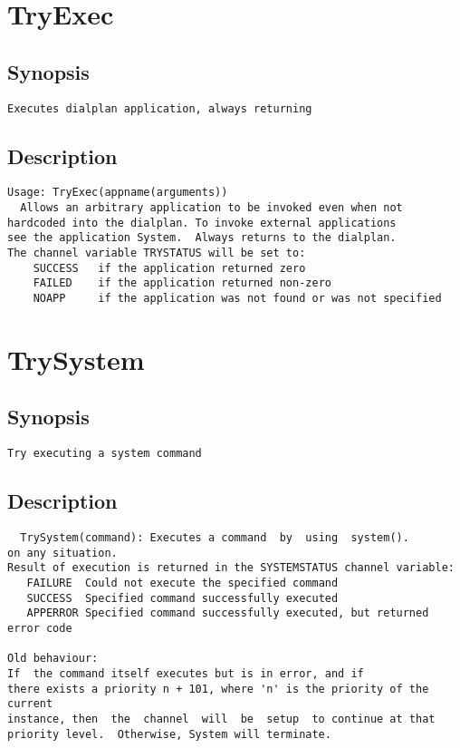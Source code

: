 \section{TryExec}
\subsection{Synopsis}
\begin{verbatim}
Executes dialplan application, always returning
\end{verbatim}
\subsection{Description}
\begin{verbatim}
Usage: TryExec(appname(arguments))
  Allows an arbitrary application to be invoked even when not
hardcoded into the dialplan. To invoke external applications
see the application System.  Always returns to the dialplan.
The channel variable TRYSTATUS will be set to:
    SUCCESS   if the application returned zero
    FAILED    if the application returned non-zero
    NOAPP     if the application was not found or was not specified

\end{verbatim}


\section{TrySystem}
\subsection{Synopsis}
\begin{verbatim}
Try executing a system command
\end{verbatim}
\subsection{Description}
\begin{verbatim}
  TrySystem(command): Executes a command  by  using  system().
on any situation.
Result of execution is returned in the SYSTEMSTATUS channel variable:
   FAILURE	Could not execute the specified command
   SUCCESS	Specified command successfully executed
   APPERROR	Specified command successfully executed, but returned error code

Old behaviour:
If  the command itself executes but is in error, and if
there exists a priority n + 101, where 'n' is the priority of the current
instance, then  the  channel  will  be  setup  to continue at that
priority level.  Otherwise, System will terminate.

\end{verbatim}


